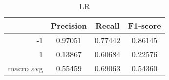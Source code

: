 \begin{table}[!h]
    \centering
    \renewcommand{\arraystretch}{1.5}
    \begin{tabular}{|r|c|c|c|}
        \hline
                  & Precision & Recall & F1-score \\ \hline
        -1        &     0.97051     &     0.77442   &    0.86145      \\ \hline
        1         &     0.13867      &     0.60684   &   0.22576       \\ \hline
        macro avg &      0.55459     &     0.69063   &    0.54360      \\ \hline
    \end{tabular}
    \caption{LR}
\end{table}
